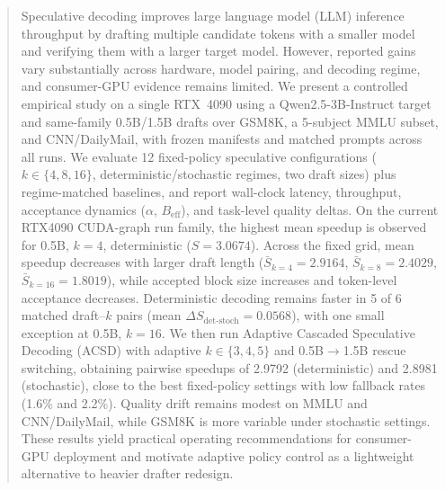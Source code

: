 \begin{abstract}
Speculative decoding improves large language model (LLM) inference throughput by drafting multiple candidate tokens with a smaller model and verifying them with a larger target model. However, reported gains vary substantially across hardware, model pairing, and decoding regime, and consumer-GPU evidence remains limited. We present a controlled empirical study on a single RTX~4090 using a Qwen2.5-3B-Instruct target and same-family 0.5B/1.5B drafts over GSM8K, a 5-subject MMLU subset, and CNN/DailyMail, with frozen manifests and matched prompts across all runs. We evaluate 12 fixed-policy speculative configurations ($k\in\{4,8,16\}$, deterministic/stochastic regimes, two draft sizes) plus regime-matched baselines, and report wall-clock latency, throughput, acceptance dynamics ($\alpha$, $B_{\text{eff}}$), and task-level quality deltas. On the current RTX4090 CUDA-graph run family, the highest mean speedup is observed for 0.5B, $k{=}4$, deterministic ($S{=}3.0674$). Across the fixed grid, mean speedup decreases with larger draft length ($\bar{S}_{k=4}=2.9164$, $\bar{S}_{k=8}=2.4029$, $\bar{S}_{k=16}=1.8019$), while accepted block size increases and token-level acceptance decreases. Deterministic decoding remains faster in 5 of 6 matched draft--$k$ pairs (mean $\Delta S_{\text{det-stoch}}=0.0568$), with one small exception at 0.5B, $k{=}16$. We then run Adaptive Cascaded Speculative Decoding (ACSD) with adaptive $k\in\{3,4,5\}$ and 0.5B$\rightarrow$1.5B rescue switching, obtaining pairwise speedups of 2.9792 (deterministic) and 2.8981 (stochastic), close to the best fixed-policy settings with low fallback rates (1.6\% and 2.2\%). Quality drift remains modest on MMLU and CNN/DailyMail, while GSM8K is more variable under stochastic settings. These results yield practical operating recommendations for consumer-GPU deployment and motivate adaptive policy control as a lightweight alternative to heavier drafter redesign.
\end{abstract}